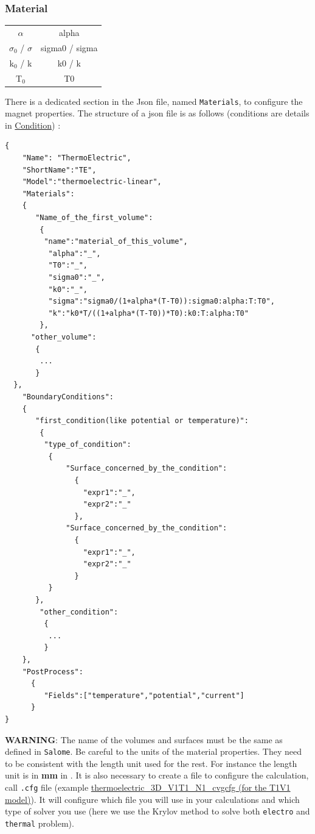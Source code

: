 \documentclass[11pt]{amsart}
\newcommand{\admonition}[2]{\textbf{#1}: {#2}}
\begin{document}
\hypertarget{x-material}{\subsubsection{Material}}
\begin{center}
\begin{tabular}{|c|c|}
\hline
$\alpha$ & alpha \\ 
$\sigma_{0}$ / $\sigma$ & sigma0 / sigma \\ 
k${}_{0}$ / k & k0 / k \\ 
T${}_{0}$ & T0 \\ 
\hline
\end{tabular}
\end{center}

There is a dedicated section in the Json file, named \texttt{Materials}, to configure the magnet properties.
The structure of a json file is as follows (conditions are details in \hyperlink{x-condition}{Condition}) :


\begin{verbatim}
{
    "Name": "ThermoElectric",
    "ShortName":"TE",
    "Model":"thermoelectric-linear",
    "Materials":
    {
	   "Name_of_the_first_volume":
	    {
	     "name":"material_of_this_volume",
	      "alpha":"_",
	      "T0":"_",
	      "sigma0":"_",
	      "k0":"_",
	      "sigma":"sigma0/(1+alpha*(T-T0)):sigma0:alpha:T:T0",
	      "k":"k0*T/((1+alpha*(T-T0))*T0):k0:T:alpha:T0"
	    },
	  "other_volume":
	   {
	    ...
	   }
  },
    "BoundaryConditions":
    {
	   "first_condition(like potential or temperature)":
	    {
	     "type_of_condition":
	      {
		      "Surface_concerned_by_the_condition":
		        {
		          "expr1":"_",
		          "expr2":"_"
		        },
		      "Surface_concerned_by_the_condition":
		        {
		          "expr1":"_",
		          "expr2":"_"
		        }
	      }
	   },
	    "other_condition":
	     {
	      ...
	     }
    },
    "PostProcess":
      {
	     "Fields":["temperature","potential","current"]
      }
}
\end{verbatim}

\admonition{WARNING}{The name of the volumes and surfaces must be the same as defined in \texttt{Salome}.
Be careful to the units of the material properties. They need to be consistent with the length unit used for the rest.
For instance the length unit is in \textbf{mm} in \hyperlink{test.json}{}.}
It is also necessary to create a file to configure the calculation, call \texttt{.cfg} file (example \hyperlink{example-file.cfg}{thermoelectric\_3D\_V1T1\_N1\_cvgcfg (for the T1V1 model)}).
It will configure which file you will use in your calculations and which type of solver you use (here we use the Krylov method to solve both \texttt{electro} and \texttt{thermal} problem).
\end{document}
